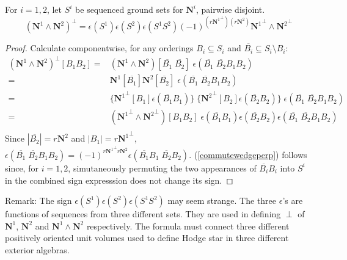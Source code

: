 \documentclass[Unicode]{cedram-alco}
\newcommand{\ext}[1]{\ensuremath{\mathbf{#1}}}
\begin{document}
\newcommand{\Nsup}[1]{\ext{N}^{#1}}
\newcommand{\NsupPerp}[1]{{\ext{N}^{#1}}^\perp}

\begin{prop}
  For $i=1, 2$, let $S^{i}$ be sequenced ground sets for $\ext{N}^{i}$, pairwise disjoint.
  \begin{equation}\label{commutewedgeperp}
    (\Nsup{1}\wedge\Nsup{2})^\perp =
    \epsilon(S^{1})\epsilon(S^{2})\epsilon(S^{1}S^{2})(-1)^{(r{\NsupPerp{1}})( r\Nsup{2})}
        \NsupPerp{1}\wedge\NsupPerp{2}
    \end{equation}
\end{prop}
\begin{proof}
  Calculate componentwise, for any orderings
  $B_i\subseteq S_i$ and $\overline{B_i}\subseteq S_i\setminus B_i$:
  \begin{equation*}
    \begin{split}
      (\Nsup{1}\wedge\Nsup{2})^\perp[B_1B_2]=
      &(\Nsup{1}\wedge\Nsup{2})[\overline{B_1}\;\overline{B_2}]\;
      \epsilon(\overline{B_1}\;\overline{B_2}B_1 B_2)\\
      =&\Nsup{1}[\overline{B_1}]\Nsup{2}[\overline{B_2}]\;\epsilon(\overline{B_1}\;\overline{B_2}B_1 B_2)\\
    =&\{\NsupPerp{1}[B_1]\epsilon(\overline{B_1}B_1)\}\;
    \{\NsupPerp{2}[B_2]\epsilon(\overline{B_2}B_2)\}\;\epsilon(\overline{B_1}\;\overline{B_2}B_1 B_2)\\
    =&(\NsupPerp{1}\wedge\NsupPerp{2})[B_1B_2]\;\epsilon(\overline{B_1}B_1)\epsilon(\overline{B_2}B_2)\epsilon(\overline{B_1}\;\overline{B_2}B_1 B_2)\\
    \end{split}
  \end{equation*}
  Since $|\overline{B_2}|=r\Nsup{2}$ and $|B_1|=r\NsupPerp{1}$,
$%
  \epsilon(\overline{B_1}\;\overline{B_2}B_1 B_2)=(-1)^{r\NsupPerp{1}r\Nsup{2}}\epsilon(\overline{B_1}B_1\;\overline{B_2} B_2)
$. %
  (\ref{commutewedgeperp}) follows since, for $i=1,2$, simutaneously permuting
  the two appearances of $\overline{B_i}B_i$ into $S^{i}$ in the combined sign expresssion does
  not change its sign.
\end{proof}

Remark: The sign $\epsilon(S^{1})\epsilon(S^{2})\epsilon(S^{1}S^{2})$ may seem strange.
The three $\epsilon$'s are functions of sequences from three different sets.  They are
used  in defining $\perp$ of $\Nsup{1}$, $\Nsup{2}$ and $\Nsup{1}\wedge\Nsup{2}$ respectively.
The formula must connect three different positively oriented unit volumes
used to define Hodge star in three different exterior algebras.
\end{document}
